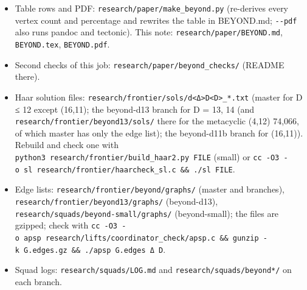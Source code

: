 \documentclass[
  10pt,
]{article}
\providecommand{\tightlist}{%
  \setlength{\itemsep}{0pt}\setlength{\parskip}{0pt}}
\begin{document}
\begin{itemize}
\tightlist
\item
  Table rows and PDF: \texttt{research/\allowbreak{}paper/\allowbreak{}make\_\allowbreak{}beyond.py} (re-derives every vertex count and percentage and
  rewrites the table in BEYOND.md; \texttt{-\/\allowbreak{}-pdf} also runs pandoc and tectonic). This note:
  \texttt{research/\allowbreak{}paper/\allowbreak{}BEYOND.md}, \texttt{BEYOND.tex}, \texttt{BEYOND.pdf}.
\item
  Second checks of this job: \texttt{research/\allowbreak{}paper/\allowbreak{}beyond\_\allowbreak{}checks/\allowbreak{}} (README there).
\item
  Haar solution files: \texttt{research/frontier/sols/d\textless{}Δ\textgreater{}D\textless{}D\textgreater{}\_*.txt}
  (master for D ≤ 12 except (16,11); the beyond-d13 branch for D = 13, 14 (and
  \texttt{research/\allowbreak{}frontier/\allowbreak{}beyond13/\allowbreak{}sols/\allowbreak{}} there for the metacyclic (4,12) 74,066, of which master has only the edge
  list); the beyond-d11b branch for (16,11)). Rebuild and check one with
  \texttt{python3\ research/\allowbreak{}frontier/\allowbreak{}build\_\allowbreak{}haar2.py\ FILE} (small) or
  \texttt{cc\ -O3\ -o\ sl\ research/\allowbreak{}frontier/\allowbreak{}haarcheck\_\allowbreak{}sl.c\ \&\&\ ./\allowbreak{}sl\ FILE}.
\item
  Edge lists: \texttt{research/\allowbreak{}frontier/\allowbreak{}beyond/\allowbreak{}graphs/\allowbreak{}} (master and branches),
  \texttt{research/\allowbreak{}frontier/\allowbreak{}beyond13/\allowbreak{}graphs/\allowbreak{}} (beyond-d13), \texttt{research/\allowbreak{}squads/\allowbreak{}beyond-small/\allowbreak{}graphs/\allowbreak{}}
  (beyond-small); the files are gzipped; check with
  \texttt{cc\ -O3\ -o\ apsp\ research/\allowbreak{}lifts/\allowbreak{}coordinator\_\allowbreak{}check/\allowbreak{}apsp.c\ \&\&\ gunzip\ -k\ G.edges.gz\ \&\&\ ./\allowbreak{}apsp\ G.edges\ Δ\ D}.
\item
  Squad logs: \texttt{research/\allowbreak{}squads/\allowbreak{}LOG.md} and \texttt{research/\allowbreak{}squads/\allowbreak{}beyond*/\allowbreak{}} on each branch.
\end{itemize}
\end{document}
